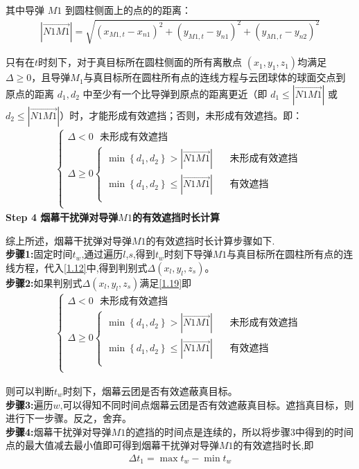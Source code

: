 \documentclass[../main.tex]{subfiles}
\begin{document}
\par 其中导弹 \( M1 \) 到圆柱侧面上的点的的距离：
\begin{align}\label{1.18}
	\left| \overrightarrow{N1M1} \right|=\sqrt{\left( x_{M1,t}-x_{n1} \right) ^2+\left( y_{M1,t}-y_{n1} \right) ^2+\left( y_{M1,t}-y_{n2} \right) ^2}
\end{align}
\par 只有在$t$时刻下，对于真目标所在圆柱侧面的所有离散点 \( (x_1, y_1, z_1) \)均满足 \( \Delta \geq 0 \)，且导弹$M_1$与真目标所在圆柱所有点的连线方程与云团球体的球面交点到原点的距离 \( d_1, d_2 \) 中至少有一个比导弹到原点的距离更近（即 \( d_1 \leq \left| \overrightarrow{N1M1} \right| \) 或 \( d_2 \leq \left| \overrightarrow{N1M1} \right| \)）时，才能形成有效遮挡；否则，未形成有效遮挡。即：
\begin{align}\label{1.19}
	\left\{ \begin{array}{l}
	\varDelta <0\ \ \ \text{未形成有效遮挡}\\
	\varDelta \ge 0\left\{ \begin{array}{l}
	\min \left\{ d_1,d_2 \right\} >\left| \overrightarrow{N1M1} \right|\ \ \ \ \ \ \ \ \text{未形成有效遮挡}\\
	\min \left\{ d_1,d_2 \right\} \le \left| \overrightarrow{N1M1} \right|\ \ \ \ \ \ \ \ \text{有效遮挡}\\
\end{array} \right.\\
\end{array} \right. 
\end{align}
\textbf{Step 4 烟幕干扰弹对导弹$M1$的有效遮挡时长计算}
\par 综上所述，烟幕干扰弹对导弹$M1$的有效遮挡时长计算步骤如下.
\\
\textbf{步骤1:}固定时间$t_w$,通过遍历$l$,$s$,得到$t_w$时刻下导弹$M1$与真目标所在圆柱所有点的连线方程，代入\eqref{1.12}中,得到判别式$\Delta \left( x_l,y_l,z_s \right)$。
\\
\textbf{步骤2:}如果判别式$\Delta \left( x_l,y_l,z_s \right)$满足\eqref{1.19}即
\begin{align}\label{1.19}
	\left\{ \begin{array}{l}
	\varDelta <0\ \ \ \text{未形成有效遮挡}\\
	\varDelta \ge 0\left\{ \begin{array}{l}
	\min \left\{ d_1,d_2 \right\} >\left| \overrightarrow{N1M1} \right|\ \ \ \ \ \ \ \ \text{未形成有效遮挡}\\
	\min \left\{ d_1,d_2 \right\} \le \left| \overrightarrow{N1M1} \right|\ \ \ \ \ \ \ \ \text{有效遮挡}\\
\end{array} \right.\\
\end{array} \right. 
\end{align}
\par 则可以判断$t_w$时刻下，烟幕云团是否有效遮蔽真目标。
\\
\textbf{步骤3:}遍历$w$,可以得知不同时间点烟幕云团是否有效遮蔽真目标。遮挡真目标，则进行下一步骤。反之，舍弃。
\\
\textbf{步骤4:}烟幕干扰弹对导弹$M1$的遮挡的时间点是连续的，所以将步骤3中得到的时间点的最大值减去最小值即可得到烟幕干扰弹对导弹$M1$的有效遮挡时长,即
\begin{align}\label{1.189}
	\varDelta t_1=\max t_w-\min t_w
\end{align}
\end{document}
